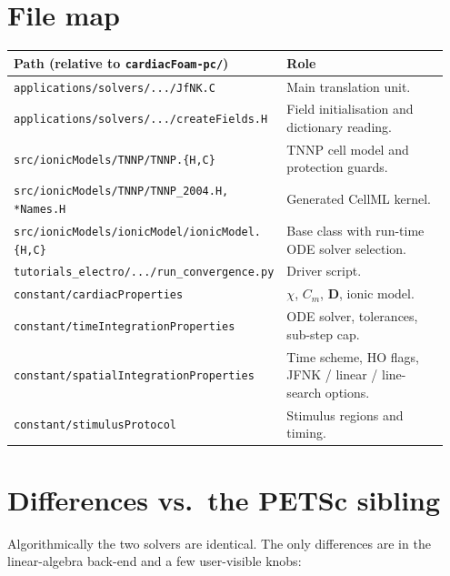 \documentclass[11pt,a4paper]{article}
\newcommand{\Dten}{\mathbf{D}}
\newcommand{\code}[1]{\texttt{\small #1}}
\begin{document}
\section{File map}

\begin{center}
\begin{tabular}{@{}p{0.55\linewidth}p{0.40\linewidth}@{}}
\toprule
Path (relative to \code{cardiacFoam-pc/}) & Role \\
\midrule
\code{applications/solvers/.../JfNK.C} & Main translation unit. \\
\code{applications/solvers/.../createFields.H} & Field initialisation
   and dictionary reading. \\
\code{src/ionicModels/TNNP/TNNP.\{H,C\}} & TNNP cell model and
   protection guards. \\
\code{src/ionicModels/TNNP/TNNP\_2004.H, *Names.H} & Generated CellML
   kernel. \\
\code{src/ionicModels/ionicModel/ionicModel.\{H,C\}} & Base class
   with run-time ODE solver selection. \\
\code{tutorials\_electro/.../run\_convergence.py} & Driver script. \\
\code{constant/cardiacProperties} & $\chi$, $C_{m}$, $\Dten$,
   ionic model. \\
\code{constant/timeIntegrationProperties} & ODE solver, tolerances,
   sub-step cap. \\
\code{constant/spatialIntegrationProperties} & Time scheme, HO flags,
   JFNK / linear / line-search options. \\
\code{constant/stimulusProtocol} & Stimulus regions and timing. \\
\bottomrule
\end{tabular}
\end{center}

\section{Differences vs.\ the PETSc sibling}

Algorithmically the two solvers are identical. The only differences
are in the linear-algebra back-end and a few user-visible knobs:
\end{document}
